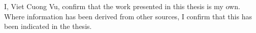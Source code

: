 
\begin{declaration}

    I, Viet Cuong Vu, confirm that the work presented in this thesis is my own. 
    Where information has been derived from other sources, I confirm that this has been indicated in the thesis.  


\end{declaration}
